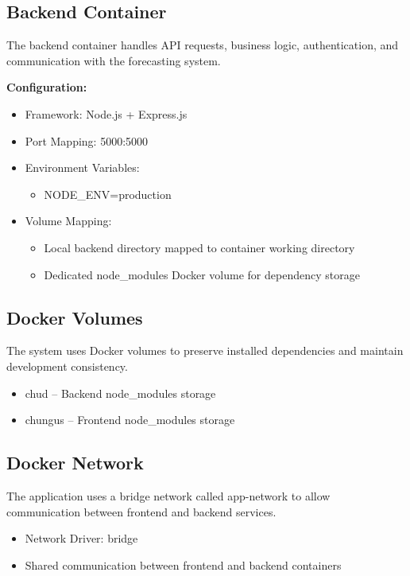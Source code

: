 \documentclass[12pt]{article}
\begin{document}
\subsection{Backend Container}
The backend container handles API requests, business logic, authentication, and communication with the forecasting system.

\textbf{Configuration:}
\begin{itemize}
\item Framework: Node.js + Express.js
\item Port Mapping: 5000:5000
\item Environment Variables:
\begin{itemize}
\item NODE\_ENV=production
\end{itemize}
\item Volume Mapping:
\begin{itemize}
\item Local backend directory mapped to container working directory
\item Dedicated node\_modules Docker volume for dependency storage
\end{itemize}
\end{itemize}

\subsection{Docker Volumes}
The system uses Docker volumes to preserve installed dependencies and maintain development consistency.

\begin{itemize}
\item chud -- Backend node\_modules storage
\item chungus -- Frontend node\_modules storage
\end{itemize}

\subsection{Docker Network}
The application uses a bridge network called app-network to allow communication between frontend and backend services.

\begin{itemize}
\item Network Driver: bridge
\item Shared communication between frontend and backend containers
\end{itemize}
\end{document}
